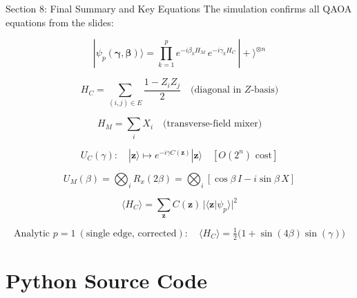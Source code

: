 \documentclass{beamer}
\begin{document}

\begin{frame}{Section 8: Final Summary and Key Equations}
The simulation confirms all QAOA equations from the slides:

\[
  |\psi_p(\boldsymbol{\gamma},\boldsymbol{\beta})\rangle
  = \prod_{k=1}^{p} e^{-i\beta_k H_M}\,e^{-i\gamma_k H_C}\,|{+}\rangle^{\otimes n}
\]

\[
  H_C = \sum_{(i,j)\in E} \frac{1 - Z_i Z_j}{2}
  \quad\text{(diagonal in $Z$-basis)}
\]

\[
  H_M = \sum_i X_i
  \quad\text{(transverse-field mixer)}
\]

\[
  U_C(\gamma): \quad |\mathbf{z}\rangle \mapsto e^{-i\gamma C(\mathbf{z})}|\mathbf{z}\rangle
  \quad [O(2^n)\text{ cost}]
\]

\[
  U_M(\beta) = \bigotimes_i R_x(2\beta) = \bigotimes_i [\cos\beta\,I - i\sin\beta\,X]
\]

\[
  \langle H_C\rangle = \sum_{\mathbf{z}} C(\mathbf{z})\,|\langle\mathbf{z}|\psi_p\rangle|^2
\]

\[
  \text{Analytic } p=1\ (\text{single edge, corrected}):
  \quad \langle H_C\rangle = \tfrac{1}{2}\bigl(1 + \sin(4\beta)\sin(\gamma)\bigr)
\]
\end{frame}

\section{Python Source Code}
\end{document}
